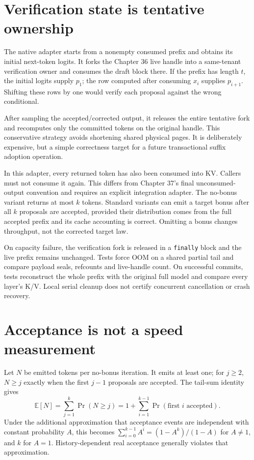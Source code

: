 \section{Verification state is tentative ownership}
\label{evod38:commit}
The native adapter starts from a nonempty consumed prefix and obtains its
initial next-token logits. It forks the Chapter 36 live handle into a
same-tenant verification owner and consumes the draft block there. If the
prefix has length $t$, the initial logits supply $p_1$; the row computed
after consuming $x_i$ supplies $p_{i+1}$. Shifting these rows by one would
verify each proposal against the wrong conditional.

After sampling the accepted/corrected output, it releases the entire
tentative fork and recomputes only the committed tokens on the original
handle. This conservative strategy avoids shortening shared physical pages.
It is deliberately expensive, but a simple correctness target for a future
transactional suffix adoption operation.


In this adapter, every returned token has also been consumed into KV.
Callers must not consume it again. This differs from Chapter 37's final
unconsumed-output convention and requires an explicit integration adapter.
The no-bonus variant returns at most $k$ tokens. Standard variants can
emit a target bonus after all $k$ proposals are accepted, provided their
distribution comes from the full accepted prefix and its cache accounting
is correct. Omitting a bonus changes throughput, not the corrected target law.

On capacity failure, the verification fork is released in a \texttt{finally}
block and the live prefix remains unchanged. Tests force OOM on a shared
partial tail and compare payload seals, refcounts and live-handle count.
On successful commits, tests reconstruct the whole prefix with the original
full model and compare every layer's K/V. Local serial cleanup does not
certify concurrent cancellation or crash recovery.

\section{Acceptance is not a speed measurement}
\label{evod38:cost}
Let $N$ be emitted tokens per no-bonus iteration. It emits at least one;
for $j\ge2$, $N\ge j$ exactly when the first $j-1$ proposals are accepted.
The tail-sum identity gives
\[
 \mathbb E[N]=\sum_{j=1}^k\Pr(N\ge j)
 =1+\sum_{i=1}^{k-1}\Pr(\text{first }i\text{ accepted}).
\]
Under the additional approximation that acceptance events are independent
with constant probability $A$, this becomes
$\sum_{i=0}^{k-1}A^i=(1-A^k)/(1-A)$ for $A\ne1$, and $k$ for $A=1$.
History-dependent real acceptance generally violates that approximation.

